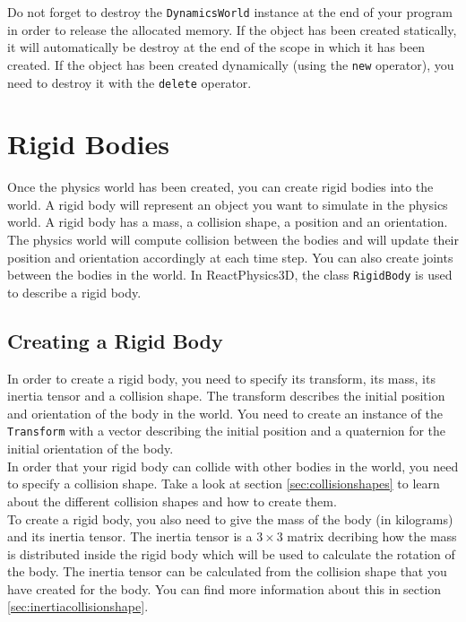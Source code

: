 \documentclass[a4paper,12pt]{article}
\begin{document}
    Do not forget to destroy the \texttt{DynamicsWorld} instance at the end of your program in order to release the allocated memory. If the object has been created statically, it will
    automatically be destroy at the end of the scope in which it has been created. If the object has been created dynamically (using the \texttt{new} operator), you need to destroy
    it with the \texttt{delete} operator.

    \section{Rigid Bodies}

    Once the physics world has been created, you can create rigid bodies into the world. A rigid body will represent an object you want to simulate in the physics world.
    A rigid body has a mass, a collision shape, a position and an orientation. The physics world will compute collision between the bodies and will update their position and
    orientation accordingly at each time step. You can also create joints between the bodies in the world. In ReactPhysics3D, the class \texttt{RigidBody} is used to describe a rigid body.

    \subsection{Creating a Rigid Body}

    In order to create a rigid body, you need to specify its transform, its mass, its inertia tensor and a collision shape. The transform describes the initial
    position and orientation of the body in the world. You need to create an instance of the \texttt{Transform} with a vector describing the
    initial position and a quaternion for the initial orientation of the body. \\

    In order that your rigid body can collide with other bodies in the world, you need to specify a collision shape. Take a look at section \ref{sec:collisionshapes} to learn about the
    different collision shapes and how to create them. \\

    To create a rigid body, you also need to give the mass of the body (in kilograms) and its inertia tensor. The inertia tensor is a $3 \times 3$ matrix decribing how the mass is
    distributed inside the rigid body which will be used to calculate the rotation of the body. The inertia tensor can be calculated from the collision shape that you have created for the
    body. You can find more information about this in section \ref{sec:inertiacollisionshape}. \\
\end{document}
